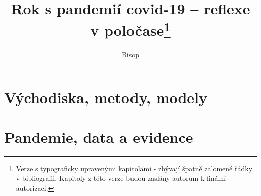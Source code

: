 \documentclass{book}
\begin{document}
%
%


\title{Rok s pandemií covid-19 -- reflexe v poločase\footnote{Verze s typograficky upravenými kapitolami - zbývají špatně zalomené řádky v bibliografii. Kapitoly z této verze budou zaslány autorům k finální autorizaci.}}
\author{Bisop}
\maketitle


%




\part{Východiska, metody, modely}







\part{Pandemie, data a evidence}








\end{document}
